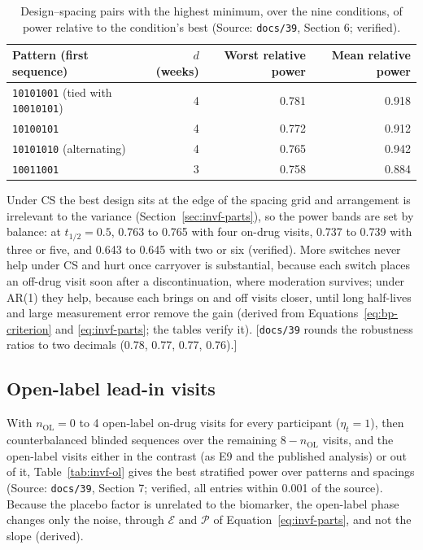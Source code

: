 \documentclass[11pt]{article}
\newcommand{\note}[1]{\textcolor{blue!60!black}{\small [#1]}}
\newcommand{\code}[1]{\texttt{#1}}
\begin{document}
\begin{table}[h]
\centering\small
\caption{Design--spacing pairs with the highest minimum, over the nine
conditions, of power relative to the condition's best (Source:
\code{docs/39}, Section 6; verified).}
\label{tab:invf-robust}
\begin{tabular}{@{}lrrr@{}}
\toprule
Pattern (first sequence) & $d$ (weeks) & Worst relative power & Mean relative power \\
\midrule
\code{10101001} (tied with \code{10010101}) & 4 & 0.781 & 0.918 \\
\code{10100101} & 4 & 0.772 & 0.912 \\
\code{10101010} (alternating) & 4 & 0.765 & 0.942 \\
\code{10011001} & 3 & 0.758 & 0.884 \\
\bottomrule
\end{tabular}
\end{table}

\noindent Under CS the best design sits at the edge of the spacing grid
and arrangement is irrelevant to the variance
(Section~\ref{sec:invf-parts}), so the power bands are set by balance:
at $t_{1/2} = 0.5$, 0.763 to 0.765 with four on-drug visits, 0.737 to
0.739 with three or five, and 0.643 to 0.645 with two or six (verified).
More switches never help under CS and hurt once carryover is substantial,
because each switch places an off-drug visit soon after a
discontinuation, where moderation survives; under AR(1) they help,
because each brings on and off visits closer, until long half-lives and
large measurement error remove the gain (derived from
Equations~\eqref{eq:bp-criterion} and \eqref{eq:invf-parts}; the tables
verify it). \note{\code{docs/39} rounds the robustness ratios to two
decimals (0.78, 0.77, 0.77, 0.76).}

\subsection{Open-label lead-in visits}
\label{sec:invf-ol}

With $n_{\text{OL}} = 0$ to 4 open-label on-drug visits for every
participant ($\eta_t = 1$), then counterbalanced blinded sequences over
the remaining $8 - n_{\text{OL}}$ visits, and the open-label visits
either in the contrast (as E9 and the published analysis) or out of it,
Table~\ref{tab:invf-ol} gives the best stratified power over patterns
and spacings (Source: \code{docs/39}, Section 7; verified, all entries
within 0.001 of the source). Because the placebo factor is unrelated to
the biomarker, the open-label phase changes only the noise, through
$\mathcal E$ and $\mathcal P$ of Equation~\eqref{eq:invf-parts}, and not
the slope (derived).
\end{document}
